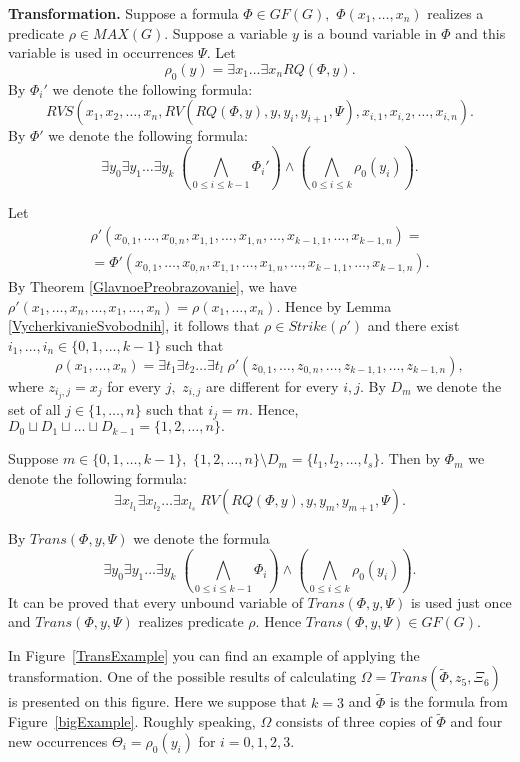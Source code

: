\documentclass{au}
\theoremstyle{plain}
\theoremstyle{definition}
\theoremstyle{remark}
\numberwithin{equation}{section}
\begin{document}
\textbf{Transformation.}
Suppose a formula $\Phi \in GF(G),$ $\Phi(x_{1},\ldots,x_{n})$ realizes a predicate $\rho\in MAX(G).$
Suppose a variable $y$ is a bound variable in $\Phi$ and this variable is
used in occurrences $\Psi.$ 
Let
$$\rho_{0}(y) = \exists x_{1}\ldots \exists x_{n} RQ(\Phi, y).$$
By $\Phi_{i}'$  we denote the following formula:
$$RVS(x_{1},x_{2},\ldots,x_{n},RV(RQ(\Phi, y), y, y_{i}, y_{i+1}, \Psi),x_{i,1},x_{i,2},\ldots,x_{i,n}).$$
By $\Phi'$  we denote the following formula:
$$\exists y_{0} \exists y_{1}\ldots \exists y_{k} \;\left( \bigwedge \limits_{0\le i \le k-1}
\Phi_{i}'\right)\wedge \left( \bigwedge \limits_{0\le i \le k}\rho_{0}(y_{i})\right).$$

Let
\begin{multline*}\rho'(x_{0,1},\ldots,x_{0,n}, x_{1,1},\ldots,x_{1,n},
\ldots,x_{k-1,1},\ldots,x_{k-1,n}) = \\ =\Phi'(x_{0,1},\ldots,x_{0,n}, x_{1,1},\ldots,x_{1,n},
\ldots,x_{k-1,1},\ldots,x_{k-1,n}).\end{multline*}
By Theorem \ref{GlavnoePreobrazovanie},
we have
$\rho'(x_{1},\ldots,x_{n},
\ldots,x_{1},\ldots,x_{n}) =
\rho(x_{1},\ldots,x_{n}).$
Hence by Lemma \ref{VycherkivanieSvobodnih}, it follows that
$\rho \in Strike(\rho')$ and
there exist $i_{1},\ldots,i_{n} \in \{0,1,\ldots,k-1\}$ such that
$$\rho(x_{1},\ldots,x_{n}) =
\exists t_{1} \exists t_{2}\ldots \exists  t_{l} \;  \rho'(z_{0,1},\ldots,z_{0,n},
\ldots,z_{k-1,1},\ldots,z_{k-1,n}),$$
where $z_{i_{j},j} = x_{j}$ for every $j,$
$z_{i,j}$ are different for every $i,j.$
By $D_{m}$ we denote the set of all $j\in \{1,\ldots,n\}$
such that $i_{j} = m.$
Hence,
$D_{0}\sqcup D_{1}\sqcup \ldots \sqcup D_{k-1} = \{1,2,\ldots,n\}.$

Suppose $m\in \{0,1,\ldots,k-1\},$
$\{1,2,\ldots,n\} \setminus D_{m} = \{l_{1},l_{2},\ldots,l_{s}\}.$
Then by $\Phi_{m}$ we denote the following formula:
$$\exists x_{l_{1}} \exists x_{l_{2}} \ldots \exists x_{l_{s}}
 \;  RV(RQ(\Phi, y), y, y_{m}, y_{m+1}, \Psi).$$

By $Trans(\Phi, y, \Psi)$ we denote the
formula
$$\exists y_{0} \exists y_{1}\ldots \exists y_{k} \; \left(\bigwedge \limits_{0\le i \le k-1}
\Phi_{i} \right)
\wedge \left( \bigwedge \limits_{0\le i \le k}\rho_{0}(y_{i})\right).$$
It can be proved that
every unbound variable of
$Trans(\Phi, y, \Psi)$ is used just once and
$Trans(\Phi, y, \Psi)$ realizes predicate $\rho.$
Hence $Trans(\Phi, y, \Psi)\in GF(G).$

In Figure~\ref{TransExample} you can find
an example of applying the transformation.
One of the possible results of calculating
$\Omega = Trans(\widetilde \Phi,z_{5},\Xi_{6})$ is presented on this figure.
Here we suppose that $k=3$ and $\widetilde \Phi$ is the formula from Figure~\ref{bigExample}.
Roughly speaking, $\Omega$ consists of three copies of $\widetilde \Phi$
and four new occurrences $\Theta_{i} = \rho_{0}(y_{i})$ for $i=0,1,2,3.$
\end{document}
